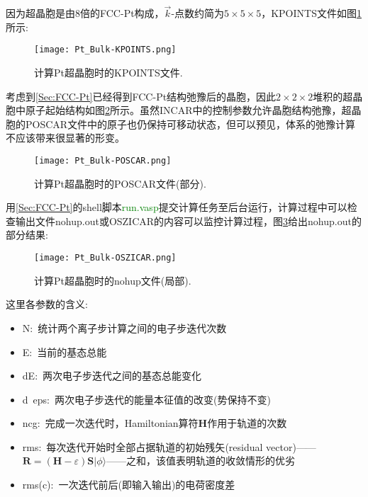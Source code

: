 因为超晶胞是由8倍的\textrm{FCC-Pt}构成，$\vec k$-点数约简为$5\times5\times5$，\textrm{KPOINTS}文件如图\ref{Pt_Bulk-KPOINTS}所示:~
\begin{figure}[h!]
\centering
\vskip -3pt
\texttt{[image: Pt\_Bulk-KPOINTS.png]}
\caption{\small \textrm{计算\textrm{Pt}超晶胞时的\textrm{KPOINTS}文件.}}%
\label{Pt_Bulk-KPOINTS}
\end{figure}

考虑到\ref{Sec:FCC-Pt}已经得到\textrm{FCC-Pt}结构弛豫后的晶胞，因此$2\times2\times2$堆积的超晶胞中原子起始结构如图\ref{Pt_Bulk-POSCAR}所示。虽然\textrm{INCAR}中的控制参数允许晶胞结构弛豫，超晶胞的\textrm{POSCAR}文件中的原子也仍保持可移动状态，但可以预见，体系的弛豫计算不应该带来很显著的形变。
\begin{figure}[h!]
\centering
\vskip -5pt
\texttt{[image: Pt\_Bulk-POSCAR.png]}
\caption{\small \textrm{计算\textrm{Pt}超晶胞时的\textrm{POSCAR}文件(部分).}}%
\label{Pt_Bulk-POSCAR}
\end{figure}

用\ref{Sec:FCC-Pt}的\textrm{shell}脚本\textcolor{green}{\textrm{run.vasp}}提交计算任务至后台运行，计算过程中可以检查输出文件\textrm{nohup.out}或\textrm{OSZICAR}的内容可以监控计算过程，图\ref{Pt_Bulk-OSZICAR}给出\textrm{nohup.out}的部分结果:
\begin{figure}[h!]
\centering
\hspace*{-25pt}
\texttt{[image: Pt\_Bulk-OSZICAR.png]}
\caption{\small \textrm{计算\textrm{Pt}超晶胞时的\textrm{nohup}文件(局部).}}%
\label{Pt_Bulk-OSZICAR}
\end{figure}
这里各参数的含义:
\begin{itemize}
	\item \textrm{N}:~统计两个离子步计算之间的电子步迭代次数
	\item \textrm{E}:~当前的基态总能
	\item \textrm{dE}:~两次电子步迭代之间的基态总能变化
	\item \textrm{d~eps}:~两次电子步迭代的能量本征值的改变(势保持不变)
	\item \textrm{ncg}:~完成一次迭代时，\textrm{Hamiltonian}算符\textbf{H}作用于轨道的次数~
	\item \textrm{rms}:~每次迭代开始时全部占据轨道的初始残矢\textrm{(residual vector)}——$\mathbf{R}=(\mathbf{H}-\varepsilon)\mathbf{S}|\phi\rangle$——之和，该值表明轨道的收敛情形的优劣
	\item \textrm{rms(c)}:~一次迭代前后(即输入输出)的电荷密度差
\end{itemize}


